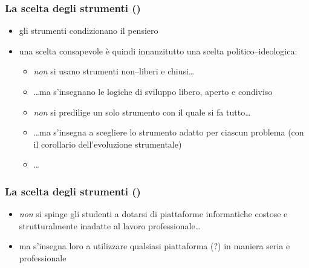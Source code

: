 \documentclass[compress,\mode]{beamer}
\begin{document}
\begin{frame}

   \frametitle<+->{La scelta degli strumenti ()}

   \begin{itemize}[<+- | alert@+>]

     \item gli strumenti condizionano il pensiero

    \item una scelta consapevole \`e quindi innanzitutto una scelta
            politico--ideologica:

      \begin{itemize}[<+- | alert@+>]

        \item \emph{non} si usano strumenti non--liberi e chiusi\ldots

        \item \ldots ma s'insegnano le logiche di sviluppo libero, aperto e condiviso

        \item \emph{non} si predilige un solo strumento con il quale si fa
                tutto\ldots

        \item \ldots ma s'insegna a scegliere lo strumento adatto per ciascun
                problema (con il corollario dell'evoluzione strumentale)

        \item \ldots

      \end{itemize}

   \end{itemize}

\end{frame}

\begin{frame}

   \frametitle<+->{La scelta degli strumenti ()}

   \begin{itemize}[<+- | alert@+>]

     \item \emph{non} si spinge gli studenti a dotarsi di piattaforme
             informatiche costose e strutturalmente inadatte al lavoro
             professionale\ldots

     \item ma s'insegna loro a utilizzare qualsiasi piattaforma (?) in maniera
             seria e professionale

   \end{itemize}

\end{frame}
\end{document}
